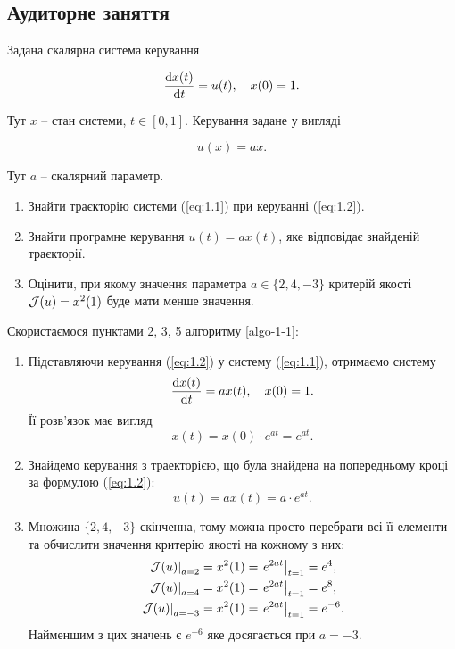 \subsection{Аудиторне заняття}

\begin{problem}
	Задана скалярна система керування 
	
	\begin{equation}
		\label{eq:1.1}
		\frac{\mathop{}\!\mathrm{d} x(t)}{\mathop{}\!\mathrm{d} t} = u(t), \quad x(0) = 1.
	\end{equation}

	Тут $x$ -- стан системи, $t \in [0, 1]$. Керування задане у вигляді

	\begin{equation}
		\label{eq:1.2}
		u(x) = a x.
	\end{equation}

	Тут $a$ -- скалярний параметр.

	\begin{enumerate}
		\item Знайти траєкторію системи (\ref{eq:1.1}) при керуванні (\ref{eq:1.2}).

		\item Знайти програмне керування $u(t) = a x (t)$, яке відповідає знайденій траєкторії. 

		\item Оцінити, при якому значення параметра $a \in \{2, 4, -3\}$ критерій якості $\mathcal{J}(u) = x^2 (1)$ буде мати менше значення.
	\end{enumerate}
\end{problem}

\begin{solution}
    Скористаємося пунктами 2, 3, 5 алгоритму \ref{algo-1-1}:
    
	\begin{enumerate}
		\item Підставляючи керування (\ref{eq:1.2}) у систему (\ref{eq:1.1}), отримаємо систему \[ \frac{\mathop{}\!\mathrm{d} x(t)}{\mathop{}\!\mathrm{d} t} = a x(t), \quad x(0) = 1. \]
		Її розв'язок має вигляд \[ x(t) = x(0) \cdot e^{a t} = e^{a t}. \]
		\item Знайдемо керування з траекторією, що була знайдена на попередньому кроці за формулою (\ref{eq:1.2}): \[ u(t) = a x(t) = a \cdot e^{a t}. \]
		\item Множина $\{2, 4, -3\}$ скінченна, тому можна просто перебрати всі її елементи та обчислити значення критерію якості на кожному з них: \[ \begin{aligned} \left. \mathcal{J} (u) \right|_{a = 2} &= x^2 (1) = \left. e^{2 a t} \right|_{t = 1} = e^4, \\ \left. \mathcal{J} (u) \right|_{a = 4} &= x^2 (1) = \left. e^{2 a t} \right|_{t = 1} = e^8, \\ \left. \mathcal{J} (u) \right|_{a = -3} &= x^2 (1) = \left. e^{2 a t} \right|_{t = 1} = e^{-6}. \end{aligned} \]
		Найменшим з цих значень є $e^{-6}$ яке досягається при $a = -3$.
	\end{enumerate}
\end{solution}

